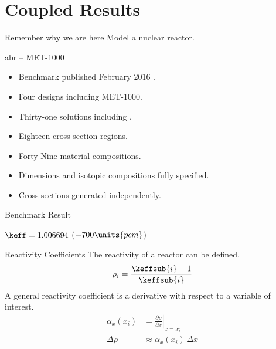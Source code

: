 \section{Coupled Results}
\label{sec:coupledResults}

\begin{frame}{Remember why we are here}
  \pause
  \huge Model a nuclear reactor.
\end{frame}

\begin{frame}{\gls{abr} -- MET-1000}
  \begin{itemize}
    \item Benchmark published February 2016 \cite{abr}.
    \item Four designs including MET-1000.
    \item Thirty-one solutions including \dif.
  \end{itemize}
  \vspace{0.2in}
  \begin{itemize}
    \item Eighteen cross-section regions.
    \item Forty-Nine material compositions.
    \item Dimensions and isotopic compositions fully specified.
    \item Cross-sections generated independently.
  \end{itemize}
\end{frame}

\begin{frame}{Benchmark Result}
  \vspace{-0.25in}
  \begin{figure}
    \centering
    \hspace{1in}
  \end{figure}
  \begin{block}{}
    \centering
    $\keff =  1.006694 $ \qquad (\dif $-700\units{pcm}$)
  \end{block}
\end{frame}

\begin{frame}{Reactivity Coefficients}
  The reactivity of a reactor can be defined.
  \begin{equation}
    \label{eq:reactivity}
    \rho_i = \frac{\keffsub{i} - 1}{\keffsub{i}}
  \end{equation}
  A general reactivity coefficient is a derivative with respect to a variable of
  interest.
  \begin{align}
    \label{eq:reactivity_coefficient}
    \alpha_x(x_i) &= \left. \frac{\partial \rho}{\partial x} \right|_{x=x_i} \\
    \Delta \rho &\approx \alpha_x(x_i) \, \Delta x
  \end{align}
\end{frame}

